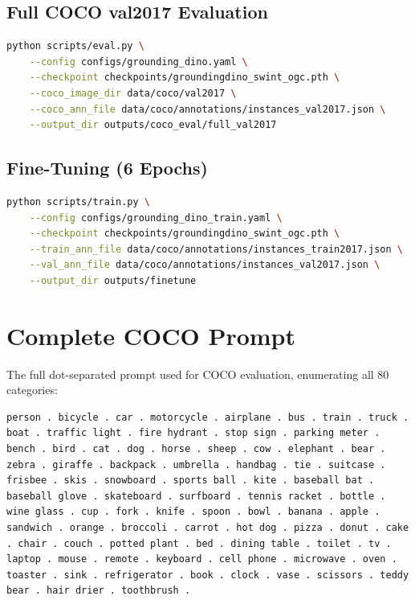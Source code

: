 \documentclass[10pt,journal,final,twocolumn]{IEEEtran}
\begin{document}
\subsection{Full COCO val2017 Evaluation}

\begin{lstlisting}[language=bash,style=bashstyle]
python scripts/eval.py \
    --config configs/grounding_dino.yaml \
    --checkpoint checkpoints/groundingdino_swint_ogc.pth \
    --coco_image_dir data/coco/val2017 \
    --coco_ann_file data/coco/annotations/instances_val2017.json \
    --output_dir outputs/coco_eval/full_val2017
\end{lstlisting}

\subsection{Fine-Tuning (6 Epochs)}

\begin{lstlisting}[language=bash,style=bashstyle]
python scripts/train.py \
    --config configs/grounding_dino_train.yaml \
    --checkpoint checkpoints/groundingdino_swint_ogc.pth \
    --train_ann_file data/coco/annotations/instances_train2017.json \
    --val_ann_file data/coco/annotations/instances_val2017.json \
    --output_dir outputs/finetune
\end{lstlisting}

\section{Complete COCO Prompt}

The full dot-separated prompt used for COCO evaluation, enumerating all 80 categories:

\begin{lstlisting}[style=bashstyle,breaklines=true]
person . bicycle . car . motorcycle . airplane . bus . train . truck . boat . traffic light . fire hydrant . stop sign . parking meter . bench . bird . cat . dog . horse . sheep . cow . elephant . bear . zebra . giraffe . backpack . umbrella . handbag . tie . suitcase . frisbee . skis . snowboard . sports ball . kite . baseball bat . baseball glove . skateboard . surfboard . tennis racket . bottle . wine glass . cup . fork . knife . spoon . bowl . banana . apple . sandwich . orange . broccoli . carrot . hot dog . pizza . donut . cake . chair . couch . potted plant . bed . dining table . toilet . tv . laptop . mouse . remote . keyboard . cell phone . microwave . oven . toaster . sink . refrigerator . book . clock . vase . scissors . teddy bear . hair drier . toothbrush .
\end{lstlisting}
\end{document}
